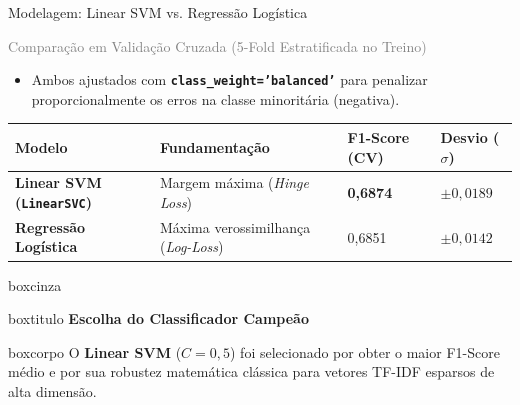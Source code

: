 \documentclass[aspectratio=43]{beamer}
\begin{document}
\begin{frame}[t]{Modelagem: Linear SVM vs. Regressão Logística}

\textcolor{gray}{\small Comparação em Validação Cruzada (5-Fold Estratificada no Treino)}

\vspace{0.2cm}

\begin{itemize}
    \scriptsize
    \item Ambos ajustados com \textbf{\texttt{class\_weight='balanced'}} para penalizar proporcionalmente os erros na classe minoritária (negativa).
\end{itemize}

\vspace{0.15cm}

\scriptsize
\renewcommand{\arraystretch}{1.25}
\begin{center}
\begin{tabular}{P{2.6cm} P{2.8cm} P{1.8cm} P{1.6cm}}
\toprule
\textbf{Modelo} & \textbf{Fundamentação} & \textbf{F1-Score (CV)} & \textbf{Desvio ($\sigma$)} \\
\midrule
\textbf{Linear SVM (\texttt{LinearSVC})} & Margem máxima (\textit{Hinge Loss}) & \textbf{0,6874} & $\pm 0{,}0189$ \\
\textbf{Regressão Logística} & Máxima verossimilhança (\textit{Log-Loss}) & 0,6851 & $\pm 0{,}0142$ \\
\bottomrule
\end{tabular}
\end{center}

\vspace{0.35cm}

\begin{center}
\begin{beamercolorbox}[wd=0.96\textwidth, sep=0pt]{boxcinza}
  \begin{beamercolorbox}[wd=0.96\textwidth, ht=0.45cm, dp=0.08cm, leftskip=0.2cm]{boxtitulo}
    {\color{uelgreen}\scriptsize\textbf{Escolha do Classificador Campeão}}
  \end{beamercolorbox}
  \begin{beamercolorbox}[wd=0.96\textwidth, sep=0.2cm]{boxcorpo}
    \scriptsize O \textbf{Linear SVM} ($C = 0{,}5$) foi selecionado por obter o maior F1-Score médio e por sua robustez matemática clássica para vetores TF-IDF esparsos de alta dimensão.
  \end{beamercolorbox}
\end{beamercolorbox}
\end{center}

\end{frame}
\end{document}
